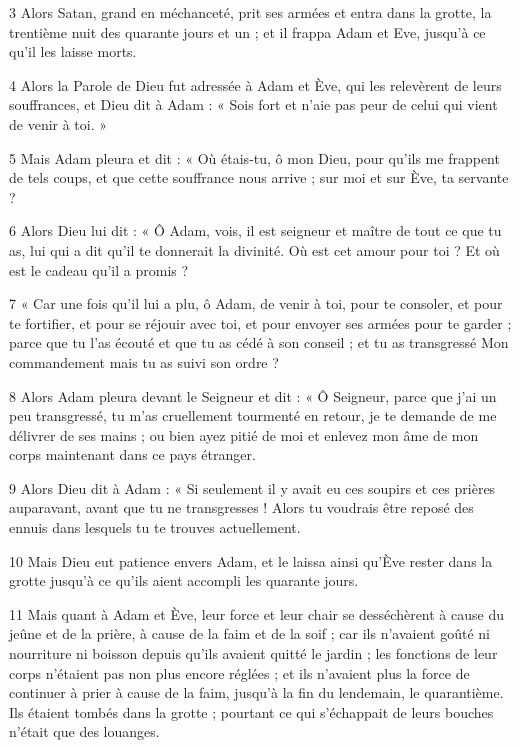 \par 3 Alors Satan, grand en méchanceté, prit ses armées et entra dans la grotte, la trentième nuit des quarante jours et un ; et il frappa Adam et Eve, jusqu'à ce qu'il les laisse morts.

\par 4 Alors la Parole de Dieu fut adressée à Adam et Ève, qui les relevèrent de leurs souffrances, et Dieu dit à Adam : « Sois fort et n'aie pas peur de celui qui vient de venir à toi. »

\par 5 Mais Adam pleura et dit : « Où étais-tu, ô mon Dieu, pour qu'ils me frappent de tels coups, et que cette souffrance nous arrive ; sur moi et sur Ève, ta servante ?

\par 6 Alors Dieu lui dit : « Ô Adam, vois, il est seigneur et maître de tout ce que tu as, lui qui a dit qu'il te donnerait la divinité. Où est cet amour pour toi ? Et où est le cadeau qu’il a promis ?

\par 7 « Car une fois qu'il lui a plu, ô Adam, de venir à toi, pour te consoler, et pour te fortifier, et pour se réjouir avec toi, et pour envoyer ses armées pour te garder ; parce que tu l'as écouté et que tu as cédé à son conseil ; et tu as transgressé Mon commandement mais tu as suivi son ordre ?

\par 8 Alors Adam pleura devant le Seigneur et dit : « Ô Seigneur, parce que j'ai un peu transgressé, tu m'as cruellement tourmenté en retour, je te demande de me délivrer de ses mains ; ou bien ayez pitié de moi et enlevez mon âme de mon corps maintenant dans ce pays étranger.

\par 9 Alors Dieu dit à Adam : « Si seulement il y avait eu ces soupirs et ces prières auparavant, avant que tu ne transgresses ! Alors tu voudrais être reposé des ennuis dans lesquels tu te trouves actuellement.

\par 10 Mais Dieu eut patience envers Adam, et le laissa ainsi qu'Ève rester dans la grotte jusqu'à ce qu'ils aient accompli les quarante jours.

\par 11 Mais quant à Adam et Ève, leur force et leur chair se desséchèrent à cause du jeûne et de la prière, à cause de la faim et de la soif ; car ils n'avaient goûté ni nourriture ni boisson depuis qu'ils avaient quitté le jardin ; les fonctions de leur corps n'étaient pas non plus encore réglées ; et ils n'avaient plus la force de continuer à prier à cause de la faim, jusqu'à la fin du lendemain, le quarantième. Ils étaient tombés dans la grotte ; pourtant ce qui s'échappait de leurs bouches n'était que des louanges.

